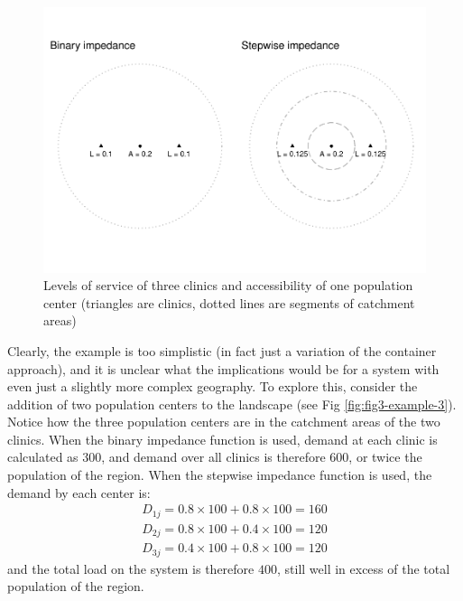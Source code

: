 \documentclass[10pt,letterpaper]{article}
\begin{document}
\begin{figure}
\includegraphics[width=0.95\linewidth]{Supply_and_Demand_Inflation_in_FCA_Methods_v2.1_files/figure-latex/fig2-example-2-1} \caption{\label{fig:fig2-example-2}Levels of service of three clinics and accessibility of one population center (triangles are clinics, dotted lines are segments of catchment areas)}\label{fig:fig2-example-2}
\end{figure}

Clearly, the example is too simplistic (in fact just a variation of the
container approach), and it is unclear what the implications would be
for a system with even just a slightly more complex geography. To
explore this, consider the addition of two population centers to the
landscape (see Fig \ref{fig:fig3-example-3}). Notice how the three
population centers are in the catchment areas of the two clinics. When
the binary impedance function is used, demand at each clinic is
calculated as \(300\), and demand over all clinics is therefore 600, or
twice the population of the region. When the stepwise impedance function
is used, the demand by each center is: \[
\begin{array}{c}
D_{1j} = 0.8\times 100 + 0.8 \times 100 = 160\\
D_{2j} = 0.8\times 100 + 0.4 \times 100 = 120\\
D_{3j} = 0.4\times 100 + 0.8 \times 100 = 120
\end{array}
\] and the total load on the system is therefore \(400\), still well in
excess of the total population of the region.
\end{document}
